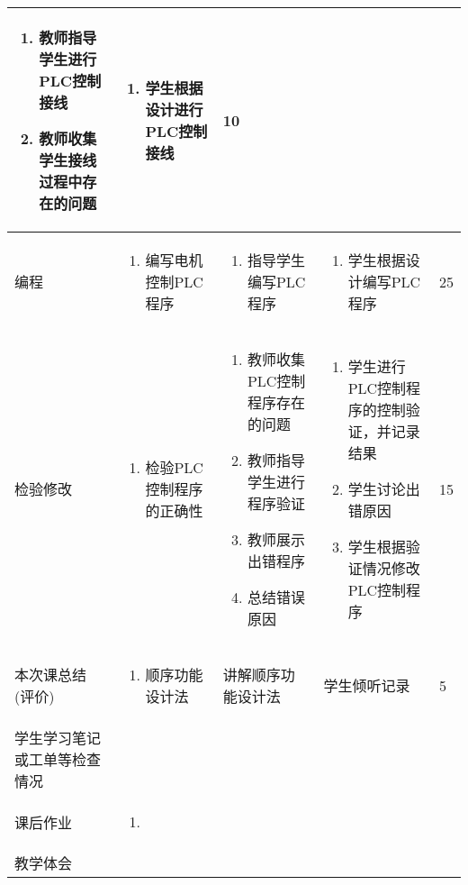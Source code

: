 {\begin{landscape}
\begin{longtable}{|m{10mm}|m{50mm}|m{50mm}|m{50mm}|m{15mm}|}
\begin{enumerate}
\item 教师指导学生进行PLC控制接线
\item 教师收集学生接线过程中存在的问题
\end{enumerate} &\begin{enumerate}
\item 学生根据设计进行PLC控制接线
\end{enumerate} &10 \\\hline
编程&
\begin{enumerate}
\item 编写电机控制PLC程序
\end{enumerate} &\begin{enumerate}
\item 指导学生编写PLC程序
\end{enumerate} &\begin{enumerate}
\item 学生根据设计编写PLC程序
\end{enumerate} &25 \\\hline
\centering 检验修改&\begin{enumerate}
\item 检验PLC控制程序的正确性
\end{enumerate}&\begin{enumerate}
\item 教师收集PLC控制程序存在的问题
\item 教师指导学生进行程序验证
\item 教师展示出错程序
\item 总结错误原因
\end{enumerate}&\begin{enumerate}
\item 学生进行PLC控制程序的控制验证，并记录结果
\item 学生讨论出错原因
\item 学生根据验证情况修改PLC控制程序
\end{enumerate}&15 \\\hline
\centering 本次课总结(评价)&\begin{enumerate}
\item 顺序功能设计法 
\end{enumerate}&讲解顺序功能设计法  &学生倾听记录 &5 \\\hline
\centering 学生学习笔记或工单等检查情况&\multicolumn{4}{m{165mm}|}{\quad}\\\hline
\centering 课后作业&\multicolumn{4}{m{165mm}|}{\begin{enumerate}
\item 
\end{enumerate}}\\\hline
\centering 教学体会&\multicolumn{4}{m{165mm}|}{\quad}\\
\end{longtable}


\end{landscape}}
